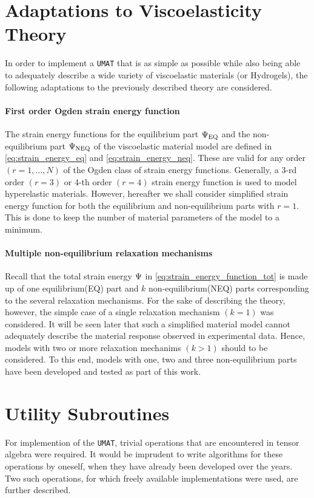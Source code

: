 \section{Adaptations to Viscoelasticity Theory}
In order to implement a \texttt{UMAT} that is as simple as possible while also being able to adequately describe a wide variety of viscoelastic materials (or Hydrogels), the following adaptations to the previously described theory are considered.
\paragraph*{First order Ogden strain energy function} The strain energy functions for the equilibrium part \(\Psi_{\text{EQ}}\) and the non-equilibrium part \(\Psi_{\text{NEQ}}\) of the viscoelastic material model are defined in \cref{eq:strain_energy_eq} and \cref{eq:strain_energy_neq}. These are valid for any order \((r = 1,\ldots,N)\) of the Ogden class of strain energy functions. Generally, a 3-rd order \((r=3)\) or 4-th order \((r=4)\) strain energy function is used to model hyperelastic materials. However, hereafter we shall consider simplified strain energy function for both the equilibrium and non-equilibrium parts with \(r=1\). This is done to keep the number of material parameters of the model to a minimum. 

\paragraph*{Multiple non-equilibrium relaxation mechanisms}
Recall that the total strain energy \(\Psi\) in \cref{eq:strain_energy_function_tot} is made up of one equilibrium(EQ) part and \(k\) non-equilibrium(NEQ) parts corresponding to the several relaxation mechanisms. For the sake of describing the theory, however, the simple case of a single relaxation mechanism \((k=1)\) was considered. It will be seen later that such a simplified material model cannot adequately describe the material response observed in experimental data. Hence, models with two or more relaxation mechanims \((k > 1)\) should to be considered. To this end, models with one, two and three non-equilibrium parts have been developed and tested as part of this work.

\section{Utility Subroutines}
For implemention of the \texttt{UMAT}, trivial operations that are encountered in tensor algebra were required. It would be imprudent to write algorithms for these operations by oneself, when they have already been developed over the years. Two such operations, for which freely available implementations were used, are further described. 

